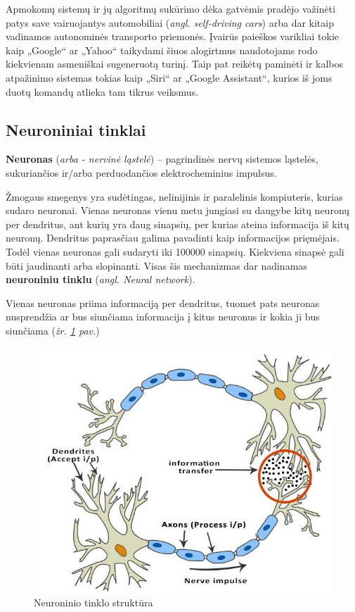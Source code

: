 \documentclass{VUMIFInfKursinis}
\begin{document}
Apmokomų sistemų ir jų algoritmų sukūrimo dėka gatvėmis pradėjo važinėti patys save vairuojantys automobiliai (\textit{angl. self-driving cars}) arba dar kitaip vadinamos autonominės transporto priemonės. Įvairūs paieškos varikliai tokie kaip „Google“ ar „Yahoo“ taikydami šiuos alogirtmus naudotojams rodo kiekvienam asmeniškai sugeneruotą turinį. Taip pat reikėtų paminėti ir kalbos atpažinimo sistemas tokias kaip „Siri“ ar „Google Assistant“, kurios iš joms duotų komandų atlieka tam tikrus veiksmus.

\subsection{Neuroniniai tinklai}
\textbf{Neuronas} (\textit{arba - nervinė ląstelė}) – pagrindinės nervų sistemos ląstelės, sukuriančios ir/arba perduodančios elektrocheminius impulsus.



Žmogaus smegenys yra sudėtingas, nelinijinis ir paralelinis kompiuteris\cite{Hay09}, kurias sudaro neuronai. Vienas neuronas vienu metu jungiasi su daugybe kitų neuronų per dendritus, ant kurių yra daug sinapsių, per kurias ateina informacija iš kitų neuronų. Dendritus paprasčiau galima pavadinti kaip informacijos prięmėjais. Todėl vienas neuronas gali sudaryti iki 100000 sinapsių. Kiekviena sinapsė gali būti jaudinanti arba slopinanti. Visas šis mechanizmas dar nadinamas \textbf{neuroniniu tinklu} (\textit{angl. Neural network}).

Vienas neuronas priima informaciją per dendritus, tuomet pats neuronas nusprendžia ar bus siunčiama informacija į kitus neuronus ir kokia ji bus siunčiama (\textit{žr. \ref{img:neuron_structure} pav.})

\begin{figure}[H]
	\centering
	\includegraphics[width=.5\linewidth]{img/neuron-structure}
	\caption[]{Neuroninio tinklo struktūra\footnotemark}
	\label{img:neuron_structure}
\end{figure}
\end{document}
